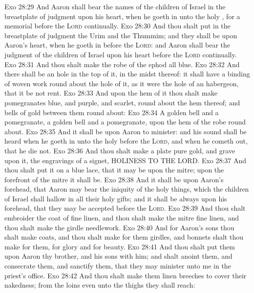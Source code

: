 \vs Exo 28:29 And Aaron shall bear the names of the children of Israel in the breastplate of judgment upon his heart, when he goeth in unto the holy , for a memorial before the \textsc{Lord} continually.
\vs Exo 28:30 And thou shalt put in the breastplate of judgment the Urim and the Thummim; and they shall be upon Aaron's heart, when he goeth in before the \textsc{Lord}: and Aaron shall bear the judgment of the children of Israel upon his heart before the \textsc{Lord} continually.
\vs Exo 28:31 And thou shalt make the robe of the ephod all  blue.
\vs Exo 28:32 And there shall be an hole in the top of it, in the midst thereof: it shall have a binding of woven work round about the hole of it, as it were the hole of an habergeon, that it be not rent.
\vs Exo 28:33 And  upon the hem of it thou shalt make pomegranates  blue, and  purple, and  scarlet, round about the hem thereof; and bells of gold between them round about:
\vs Exo 28:34 A golden bell and a pomegranate, a golden bell and a pomegranate, upon the hem of the robe round about.
\vs Exo 28:35 And it shall be upon Aaron to minister: and his sound shall be heard when he goeth in unto the holy  before the \textsc{Lord}, and when he cometh out, that he die not.
\vs Exo 28:36 And thou shalt make a plate  pure gold, and grave upon it,  the engravings of a signet, HOLINESS TO THE LORD.
\vs Exo 28:37 And thou shalt put it on a blue lace, that it may be upon the mitre; upon the forefront of the mitre it shall be.
\vs Exo 28:38 And it shall be upon Aaron's forehead, that Aaron may bear the iniquity of the holy things, which the children of Israel shall hallow in all their holy gifts; and it shall be always upon his forehead, that they may be accepted before the \textsc{Lord}.
\vs Exo 28:39 And thou shalt embroider the coat of fine linen, and thou shalt make the mitre  fine linen, and thou shalt make the girdle  needlework.
\vs Exo 28:40 And for Aaron's sons thou shalt make coats, and thou shalt make for them girdles, and bonnets shalt thou make for them, for glory and for beauty.
\vs Exo 28:41 And thou shalt put them upon Aaron thy brother, and his sons with him; and shalt anoint them, and consecrate them, and sanctify them, that they may minister unto me in the priest's office.
\vs Exo 28:42 And thou shalt make them linen breeches to cover their nakedness; from the loins even unto the thighs they shall reach:
